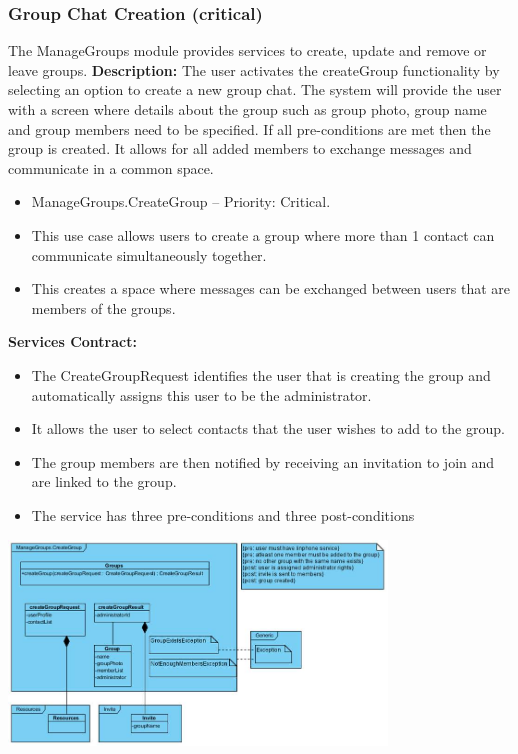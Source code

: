 \documentclass[11pt]{article}
\begin{document}
\subsubsection{Group Chat Creation (critical)}
The ManageGroups module provides services to create, update and remove or leave groups.\newline
\textbf{Description:} The user activates the createGroup functionality by selecting an option to create a new group chat. The system will provide the user with a screen where details about the group such as group photo, group name and group members need to be specified. If all pre-conditions are met then the group is created. It allows for all added members to exchange messages and communicate in a common space.\newline
\newline
\begin{itemize}
\item ManageGroups.CreateGroup – Priority: Critical.
\item	This use case allows users to create a group where more than 1 contact can communicate simultaneously together.
\item	This creates a space where messages can be exchanged between users that are members of the groups.
\end{itemize}
\textbf{Services Contract:} \newline
	\newline
\begin{itemize}
\item The CreateGroupRequest identifies the user that is creating the group and automatically assigns this user to be the administrator.
\item It allows the user to select contacts that the user wishes to add to the group.
\item The group members are then notified by receiving an invitation to join and are linked to the group.
\item The service has three pre-conditions and three post-conditions
\end{itemize}
\includegraphics[width=380px]{./images/serviceContract-create.jpg} \newline
\end{document}
